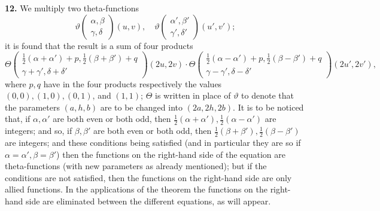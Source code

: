 \documentclass[11pt]{article}
\begin{document}
\textbf{12.} We multiply two theta-functions
\[
\vartheta\!\begin{pmatrix} \alpha,\beta \\ \gamma,\delta \end{pmatrix}\!(u,v),\quad \vartheta\!\begin{pmatrix} \alpha',\beta' \\ \gamma',\delta' \end{pmatrix}\!(u',v');
\]
it is found that the result is a sum of four products
\[
\Theta\!\begin{pmatrix} \tfrac{1}{2}(\alpha + \alpha') + p,\tfrac{1}{2}(\beta + \beta') + q \\ \gamma + \gamma',\delta + \delta' \end{pmatrix}\!(2u, 2v)\cdot \Theta\!\begin{pmatrix} \tfrac{1}{2}(\alpha - \alpha') + p,\tfrac{1}{2}(\beta - \beta') + q \\ \gamma - \gamma',\delta - \delta' \end{pmatrix}\!(2u', 2v'),
\]
where $p,q$ have in the four products respectively the values $(0,0),(1,0),(0,1)$, and $(1,1)$; $\Theta$ is written in place of $\vartheta$ to denote that the parameters $(a,h,b)$ are to be changed into $(2a, 2h, 2b)$. It is to be noticed that, if $\alpha,\alpha'$ are both even or both odd, then $\tfrac{1}{2}(\alpha + \alpha'), \tfrac{1}{2}(\alpha - \alpha')$ are integers; and so, if $\beta,\beta'$ are both even or both odd, then $\tfrac{1}{2}(\beta + \beta'), \tfrac{1}{2}(\beta - \beta')$ are integers; and these conditions being satisfied (and in particular they are so if $\alpha = \alpha',\beta = \beta'$) then the functions on the right-hand side of the equation are theta-functions (with new parameters as already mentioned); but if the conditions are not satisfied, then the functions on the right-hand side are only allied functions. In the applications of the theorem the functions on the right-hand side are eliminated between the different equations, as will appear.

\medskip
\end{document}

